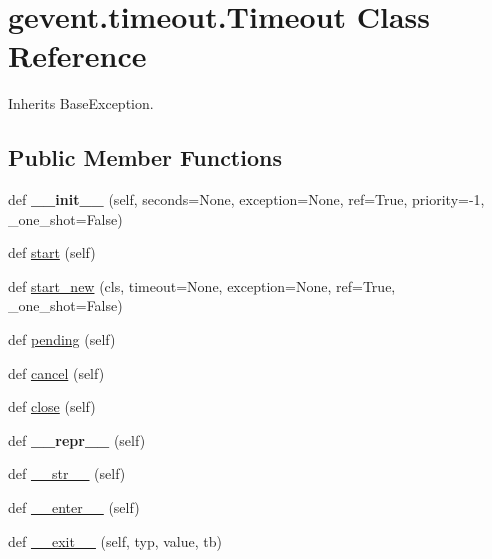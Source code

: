 \hypertarget{classgevent_1_1timeout_1_1_timeout}{}\section{gevent.\+timeout.\+Timeout Class Reference}
\label{classgevent_1_1timeout_1_1_timeout}


Inherits Base\+Exception.

\subsection*{Public Member Functions}
\begin{DoxyCompactItemize}
\item 
\mbox{\label{classgevent_1_1timeout_1_1_timeout_a5bc99887abdb4a04fe0953eb4162e095}} 
def {\bfseries \+\_\+\+\_\+init\+\_\+\+\_\+} (self, seconds=None, exception=None, ref=True, priority=-\/1, \+\_\+one\+\_\+shot=False)
\item 
def \hyperlink{classgevent_1_1timeout_1_1_timeout_aecfcded6ca193f39d43e1b837ede20bf}{start} (self)
\item 
def \hyperlink{classgevent_1_1timeout_1_1_timeout_aad464b2ffc2d4da13f849135ec777dc2}{start\+\_\+new} (cls, timeout=None, exception=None, ref=True, \+\_\+one\+\_\+shot=False)
\item 
def \hyperlink{classgevent_1_1timeout_1_1_timeout_a9129164e18e7f93454a49606513b1bf6}{pending} (self)
\item 
def \hyperlink{classgevent_1_1timeout_1_1_timeout_a7c9775359278ff54e4653b2e8522ba7b}{cancel} (self)
\item 
def \hyperlink{classgevent_1_1timeout_1_1_timeout_ac85307f16caa1c0de21b395c63a5fbb0}{close} (self)
\item 
\mbox{\label{classgevent_1_1timeout_1_1_timeout_a7af1abb270d5b529c9bb1a84421f606f}} 
def {\bfseries \+\_\+\+\_\+repr\+\_\+\+\_\+} (self)
\item 
def \hyperlink{classgevent_1_1timeout_1_1_timeout_a80b97bf726be5c11358d1f6cceae2983}{\+\_\+\+\_\+str\+\_\+\+\_\+} (self)
\item 
def \hyperlink{classgevent_1_1timeout_1_1_timeout_aef6ed2b9efb272007383f7618bdefc6d}{\+\_\+\+\_\+enter\+\_\+\+\_\+} (self)
\item 
def \hyperlink{classgevent_1_1timeout_1_1_timeout_a96c60d581798d23384f73dd75d83b855}{\+\_\+\+\_\+exit\+\_\+\+\_\+} (self, typ, value, tb)
\end{DoxyCompactItemize}
